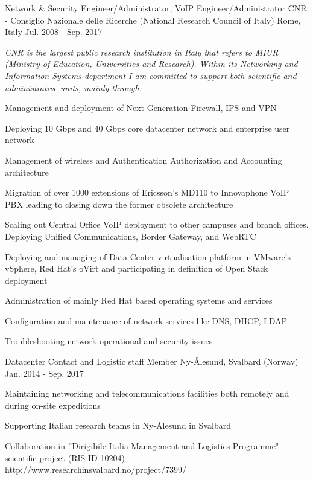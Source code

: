 \begin{cventries}
\cventry
{Network \& Security Engineer/Administrator, VoIP Engineer/Administrator} %
{CNR - Consiglio Nazionale delle Ricerche (National Research Council of Italy)} %
{Rome, Italy} %
{Jul. 2008 - Sep. 2017} %
{ %
\begin{cvitems}
\item {\textit{CNR is the largest public research institution in Italy that refers to MIUR (Ministry of Education, Universities and Research). Within its Networking and Information Systems department I am committed to support both scientific and administrative units, mainly through:}}
\item {Management and deployment of Next Generation Firewall, IPS and VPN}
\item {Deploying 10 Gbps and 40 Gbps core datacenter network and enterprise user network}
\item {Management of wireless and Authentication Authorization and Accounting architecture}
\item {Migration of over 1000 extensions of Ericsson's MD110 to Innovaphone VoIP PBX leading to closing down the former obsolete architecture}
\item {Scaling out Central Office VoIP deployment to other campuses and branch offices. Deploying Unified Communications, Border Gateway, and WebRTC}
\item {Deploying and managing of Data Center virtualisation platform in VMware's vSphere, Red Hat's oVirt and participating in definition of Open Stack deployment}
\item {Administration of mainly Red Hat based operating systems and services}
\item {Configuration and maintenance of network services like DNS, DHCP, LDAP}
\item {Troubleshooting network operational and security issues}
\end{cvitems}
}

\vspace{0mm}
\cventry
{Datacenter Contact and Logistic staff Member} %
{} %
{Ny-Ålesund, Svalbard (Norway)} %
{Jan. 2014 - Sep. 2017} %
{ %
\begin{cvitems}
  \item {Maintaining networking and telecommunications facilities both remotely and during on-site expeditions}
  \item {Supporting Italian research teams in Ny-Ålesund in Svalbard}
  \item {Collaboration in ''Dirigibile Italia Management and Logistics Programme" scientific project (RIS-ID 10204) http://www.researchinsvalbard.no/project/7399/}
\end{cvitems}
}


\end{cventries}

